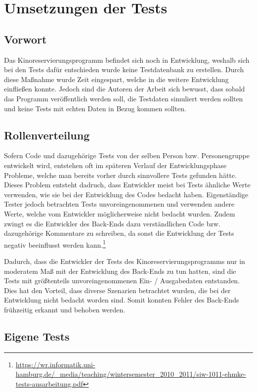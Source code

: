 \section{Umsetzungen der Tests}

\subsection{Vorwort}

Das Kinoreservierungsprogramm befindet sich noch in Entwicklung, weshalb sich bei den Tests dafür entschieden wurde keine Testdatenbank zu erstellen.
Durch diese Maßnahme wurde Zeit eingespart, welche in die weitere Entwicklung einfließen konnte. 
Jedoch sind die Autoren der Arbeit sich bewusst, dass sobald das Programm veröffentlich werden soll, die Testdaten simuliert werden sollten und keine Tests mit echten Daten in Bezug kommen sollten.

\subsection{Rollenverteilung}

Sofern Code und dazugehörige Tests von der selben Person bzw. Personengruppe entwickelt wird, entstehen oft im späteren Verlauf der Entwicklungsphase Probleme, welche man bereits vorher durch sinnvollere Tests gefunden hätte.
Dieses Problem entsteht dadruch, dass Entwickler meist bei Tests ähnliche Werte verwenden, wie sie bei der Entwicklung des Codes bedacht haben. 
Eigenständige Tester jedoch betrachten Tests unvoreingenommenen und verwenden andere Werte, welche vom Entwickler möglicherweise nicht bedacht wurden.
Zudem zwingt es die Entwickler des Back-Ends dazu verständlichen Code bzw. dazugehörige Kommentare zu schreiben, da sonst die Entwicklung der Tests negativ beeinflusst werden kann.\footnote{\url{https://wr.informatik.uni-hamburg.de/_media/teaching/wintersemester_2010_2011/siw-1011-ehmke-tests-ausarbeitung.pdf}}


Dadurch, dass die Entwickler der Tests des Kinoreservierungsprogramms nur in moderatem Maß mit der Entwicklung des Back-Ends zu tun hatten, sind die Tests mit größtenteils unvoreingenommenen Ein- / Ausgabedaten entstanden.
Dies hat den Vorteil, dass diverse Szenarien betrachtet wurden, die bei der Entwicklung nicht bedacht worden sind. 
Somit konnten Fehler des Back-Ends frühzeitig erkannt und behoben werden. 


\subsection{Eigene Tests}

